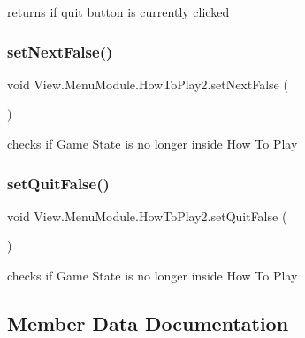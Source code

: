 returns if quit button is currently clicked \hypertarget{class_view_1_1_menu_module_1_1_how_to_play2_a05ea9b0ee4a7be839332c4fb6f709b98}{}\label{class_view_1_1_menu_module_1_1_how_to_play2_a05ea9b0ee4a7be839332c4fb6f709b98} 
\subsubsection{\texorpdfstring{set\+Next\+False()}{setNextFalse()}}
{\footnotesize\ttfamily void View.\+Menu\+Module.\+How\+To\+Play2.\+set\+Next\+False (\begin{DoxyParamCaption}{ }\end{DoxyParamCaption})\hspace{0.3cm}{\ttfamily [inline]}}

checks if Game State is no longer inside How To Play \hypertarget{class_view_1_1_menu_module_1_1_how_to_play2_a937e82de93a8ab6842574109cfc48683}{}\label{class_view_1_1_menu_module_1_1_how_to_play2_a937e82de93a8ab6842574109cfc48683} 
\subsubsection{\texorpdfstring{set\+Quit\+False()}{setQuitFalse()}}
{\footnotesize\ttfamily void View.\+Menu\+Module.\+How\+To\+Play2.\+set\+Quit\+False (\begin{DoxyParamCaption}{ }\end{DoxyParamCaption})\hspace{0.3cm}{\ttfamily [inline]}}

checks if Game State is no longer inside How To Play 

\subsection{Member Data Documentation}
\hypertarget{class_view_1_1_menu_module_1_1_how_to_play2_af60010a959740d9fe7089ed0e2a979bc}{}\label{class_view_1_1_menu_module_1_1_how_to_play2_af60010a959740d9fe7089ed0e2a979bc} 
